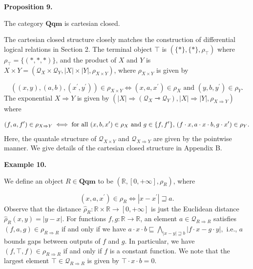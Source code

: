  
 
\par\medskip\noindent\textbf{Proposition 9.}\par
 
 
The category $\mathbf{Qqm}$ is cartesian closed.\par
 
 
 
 
The cartesian closed structure closely matches the construction of differential logical relations in Section 2. The terminal object $\top$ is $(\{\ast\},\{\ast\},\rho_{\top})$ where $\rho_{\top}=\{(\ast,\ast,\ast)\}$, and the product of $X$ and $Y$ is $X\times Y=(\mathcal{Q}_{X}\times\mathcal{Q}_{Y},|X|\times|Y|,\rho_{X\times Y})$, where $\rho_{X\times Y}$ is given by\par
    \[((x,y),(a,b),(x^{\prime},y^{\prime}))\in\rho_{X\times Y}\iff(x,a,x^{\prime})%
\in\rho_{X}\text{ and }(y,b,y^{\prime})\in\rho_{Y}.\]    
The exponential $X\Rightarrow Y$ is given by $(|X|\Rightarrow(\mathcal{Q}_{X}\rightarrowtriangle\mathcal{Q}_{Y}),|X|%
\Rightarrow|Y|,\rho_{X\Rightarrow Y})$ where\par
    \[(f,a,f^{\prime})\in\rho_{X\Rightarrow Y}\iff\text{for all }(x,b,x^{\prime})\in%
\rho_{X}\text{ and }g\in\{f,f^{\prime}\},\,(f\cdot x,a\cdot x\cdot b,g\cdot x^%
{\prime})\in\rho_{Y}.\]    
Here, the quantale structure of $\mathcal{Q}_{X\times Y}$ and $\mathcal{Q}_{X\Rightarrow Y}$ are given by the pointwise manner. We give details of the cartesian closed structure in Appendix B.\par
 
 
 
\par\medskip\noindent\textbf{Example 10.}\par
 
 
We define an object $R\in\mathbf{Qqm}$ to be $(\mathbb{R},[0,+\infty],\rho_{R})$, where\par
    \[(x,a,x^{\prime})\in\rho_{R}\iff|x-x^{\prime}|\sqsupseteq a.\]    
Observe that the distance $\widehat{\rho}_{R}:\mathbb{R}\times\mathbb{R}\to[0,+\infty]$ is just the Euclidean distance $\widehat{\rho}_{R}(x,y)=|y-x|$. For functions $f,g\colon\mathbb{R}\to\mathbb{R}$, an element $a\in\mathcal{Q}_{R\Rightarrow R}$ satisfies $(f,a,g)\in\rho_{R\Rightarrow R}$ if and only if we have $a\cdot x\cdot b\sqsubseteq\bigwedge_{|x-y|\sqsupseteq b}|f\cdot x-g\cdot y|,$ i.e., $a$ bounds gaps between outputs of $f$ and $g$. In particular, we have $(f,\top,f)\in\rho_{R\Rightarrow R}$ if and only if $f$ is a constant function. We note that the largest element $\top\in\mathcal{Q}_{R\Rightarrow R}$ is given by $\top\cdot x\cdot b=0$.\par
 
